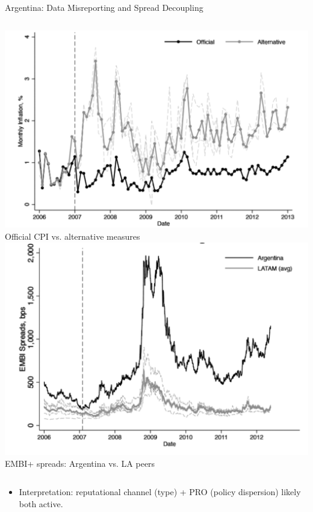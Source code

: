\documentclass[aspectratio=169,11pt,professionalfonts]{beamer}
\newcommand{\1}{\mathbb{1}}
\begin{document}
\begin{frame}{Argentina: Data Misreporting and Spread Decoupling}
  \begin{columns}[T,onlytextwidth]
    \includegraphics[width=\linewidth]{inflation_arg.png}
    \vspace{0.3em}
    {\scriptsize Official CPI vs. alternative measures}
    \includegraphics[width=\linewidth]{spread_arg.png}
    \vspace{0.3em}
    {\scriptsize EMBI+ spreads: Argentina vs. LA peers}
  \end{columns}
  \vspace{0.3em}
  \begin{itemize}
    \item Interpretation: reputational channel (type) + PRO (policy dispersion) likely
          both active.
  \end{itemize}
\end{frame}
\end{document}
